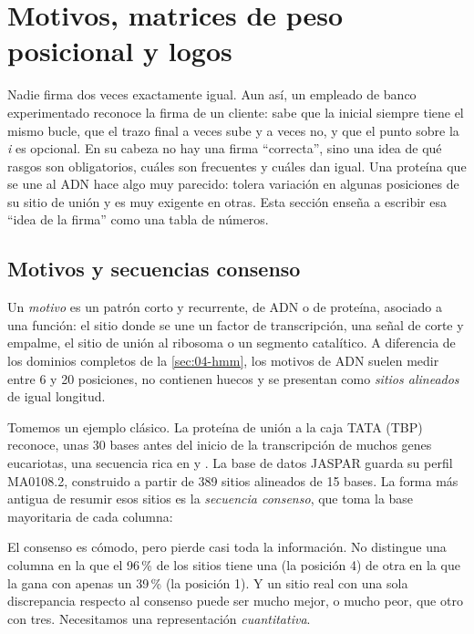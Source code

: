 \section{Motivos, matrices de peso posicional y logos}\label{sec:04-motivos}

\begin{intuicion}
Nadie firma dos veces exactamente igual. Aun así, un empleado de banco experimentado reconoce la firma de un cliente: sabe que la inicial siempre tiene el mismo bucle, que el trazo final a veces sube y a veces no, y que el punto sobre la \emph{i} es opcional. En su cabeza no hay una firma ``correcta'', sino una idea de qué rasgos son obligatorios, cuáles son frecuentes y cuáles dan igual. Una proteína que se une al ADN hace algo muy parecido: tolera variación en algunas posiciones de su sitio de unión y es muy exigente en otras. Esta sección enseña a escribir esa ``idea de la firma'' como una tabla de números.
\end{intuicion}

\subsection{Motivos y secuencias consenso}

Un \emph{motivo} es un patrón corto y recurrente, de ADN o de proteína, asociado a una función: el sitio donde se une un factor de transcripción, una señal de corte y empalme, el sitio de unión al ribosoma o un segmento catalítico. A diferencia de los dominios completos de la \cref{sec:04-hmm}, los motivos de ADN suelen medir entre 6 y 20 posiciones, no contienen huecos y se presentan como \emph{sitios alineados} de igual longitud.

Tomemos un ejemplo clásico. La proteína de unión a la caja TATA (TBP) reconoce, unas 30 bases antes del inicio de la transcripción de muchos genes eucariotas, una secuencia rica en  y . La base de datos JASPAR \parencite{c04-castromondragon2022} guarda su perfil MA0108.2, construido a partir de 389 sitios alineados de 15 bases. La forma más antigua de resumir esos sitios es la \emph{secuencia consenso}, que toma la base mayoritaria de cada columna:
\begin{center}
\end{center}
El consenso es cómodo, pero pierde casi toda la información. No distingue una columna en la que el 96\,\% de los sitios tiene una  (la posición 4) de otra en la que la  gana con apenas un 39\,\% (la posición 1). Y un sitio real con una sola discrepancia respecto al consenso puede ser mucho mejor, o mucho peor, que otro con tres. Necesitamos una representación \emph{cuantitativa}.

